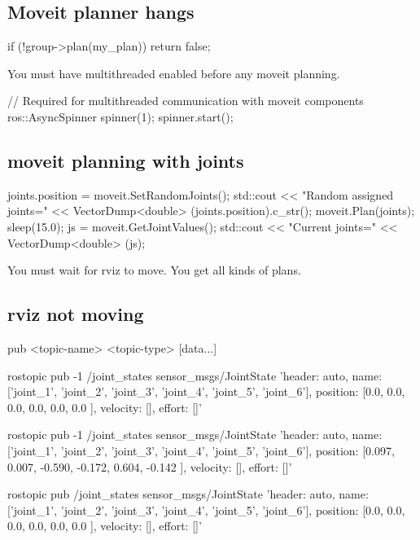 \subsection*{Moveit planner hangs }

\begin{DoxyVerb}    if (!group->plan(my_plan))
        return false;
\end{DoxyVerb}


You must have multithreaded enabled before any moveit planning. \begin{DoxyVerb}        // Required for multithreaded communication with moveit components
        ros::AsyncSpinner spinner(1);
        spinner.start();
\end{DoxyVerb}


\subsection*{moveit planning with joints }

\begin{DoxyVerb}    joints.position = moveit.SetRandomJoints();
    std::cout << "Random assigned joints=" << VectorDump<double> (joints.position).c_str();
    moveit.Plan(joints);
    sleep(15.0);
    js = moveit.GetJointValues();
    std::cout << "Current joints=" << VectorDump<double> (js);
\end{DoxyVerb}


You must wait for rviz to move. You get all kinds of plans.

\subsection*{rviz not moving }

\begin{DoxyVerb}pub <topic-name> <topic-type> [data...]

rostopic pub -1 /joint_states sensor_msgs/JointState '{header: auto, name: ['joint_1', 'joint_2', 'joint_3', 'joint_4', 'joint_5', 'joint_6'], position: [0.0, 0.0, 0.0, 0.0, 0.0, 0.0 ], velocity: [], effort: []}'

rostopic pub -1 /joint_states sensor_msgs/JointState '{header: auto, name: ['joint_1', 'joint_2', 'joint_3', 'joint_4', 'joint_5', 'joint_6'], position: [0.097, 0.007, -0.590, -0.172, 0.604, -0.142 ], velocity: [], effort: []}'

rostopic pub /joint_states sensor_msgs/JointState '{header: auto, name: ['joint_1', 'joint_2', 'joint_3', 'joint_4', 'joint_5', 'joint_6'], position: [0.0, 0.0, 0.0, 0.0, 0.0, 0.0 ], velocity: [], effort: []}'
\end{DoxyVerb}


